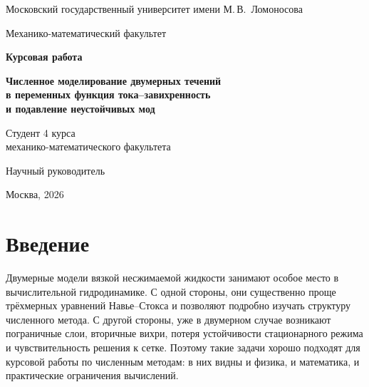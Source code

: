 \documentclass[12pt,a4paper]{article}
\begin{document}
\begin{titlepage}
    \centering

    {\large Московский государственный университет имени М.\,В.~Ломоносова\par}
    \vspace{0.5em}
    {\large Механико-математический факультет\par}

    \vfill

    {\Large\bfseries Курсовая работа\par}
    \vspace{1.2em}
    {\LARGE\bfseries Численное моделирование двумерных течений\\[0.25em]
    в переменных функция тока--завихренность\\[0.25em]
    и подавление неустойчивых мод\par}

    \vfill

    \begin{flushright}
        \begin{minipage}{0.45\textwidth}
            Студент 4 курса\\
            механико-математического факультета

            \vspace{1.5em}
            Научный руководитель
        \end{minipage}
    \end{flushright}

    \vfill

    {\large Москва, 2026}
\end{titlepage}

\clearpage
\tableofcontents
\clearpage

\section{Введение}

Двумерные модели вязкой несжимаемой жидкости занимают особое место в вычислительной гидродинамике.
С одной стороны, они существенно проще трёхмерных уравнений Навье--Стокса и позволяют подробно изучать структуру численного метода.
С другой стороны, уже в двумерном случае возникают пограничные слои, вторичные вихри, потеря устойчивости стационарного режима и чувствительность решения к сетке.
Поэтому такие задачи хорошо подходят для курсовой работы по численным методам: в них видны и физика, и математика, и практические ограничения вычислений.
\end{document}

